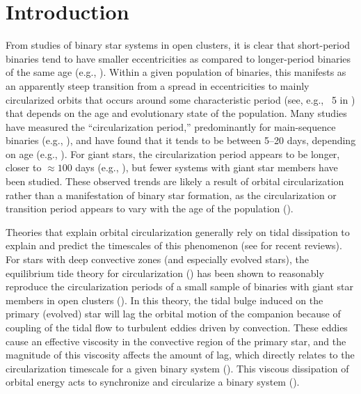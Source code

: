 \documentclass[modern, letterpaper]{aastex62}
\begin{document}

\section{Introduction} \label{sec:intro}

From studies of binary star systems in open clusters, it is clear that
short-period binaries tend to have smaller eccentricities as compared to
longer-period binaries of the same age (e.g., \citealt{Mathieu:2005}).
Within a given population of binaries, this manifests as an apparently steep
transition from a spread in eccentricities to mainly circularized orbits
that occurs around some characteristic period (see, e.g., \figurename~5 in
\citealt{Mathieu:2005}) that depends on the age and evolutionary state of the
population.
Many studies have measured the ``circularization period,'' predominantly for
main-sequence binaries (e.g., \citealt{Latham:2002, Meibom:2006,
Kjurkchieva:2017}), and have found that it tends to be between 5--20 days,
depending on age (e.g., \citealt{Mathieu:1988}).
For giant stars, the circularization period appears to be longer, closer to
$\approx 100$ days (e.g., \citealt{Mayor:1984, Bluhm:2016}), but fewer systems
with giant star members have been studied.
These observed trends are likely a result of orbital circularization rather than
a manifestation of binary star formation, as the circularization or transition
period appears to vary with the age of the population (\citealt{Meibom:2005}).

Theories that explain orbital circularization generally rely on tidal
dissipation to explain and predict the timescales of this phenomenon (see
\citealt{Mazeh:2007hp, Zahn:2008} for recent reviews).
For stars with deep convective zones (and especially evolved stars), the
equilibrium tide theory for circularization (\citealt{Zahn:1977, Zahn:1989}) has
been shown to reasonably reproduce the circularization periods of a small sample
of binaries with giant star members in open clusters (\citealt{Verbunt:1995}).
In this theory, the tidal bulge induced on the primary (evolved) star will lag
the orbital motion of the companion because of coupling of the tidal flow to
turbulent eddies driven by convection.
These eddies cause an effective viscosity in the convective region of the
primary star, and the magnitude of this viscosity affects the amount of lag,
which directly relates to the circularization timescale for a given binary
system (\citealt{Zahn:1989}).
This viscous dissipation of orbital energy acts to synchronize and circularize a
binary system (\citealt{Zahn:1977, Zahn:1989}).
\end{document}
